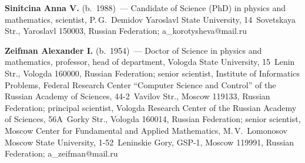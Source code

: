  \vspace*{1.5pt}
 
 \noindent
 \textbf{Sinitcina Anna V.} (b.\ 1988)~--- 
 Candidate of Science (PhD) in physics and mathematics, scientist, P.\,G.~Demidov Yaroslavl State University, 14~Sovetskaya Str., Yaroslavl 150003, 
 Russian Federation; \mbox{a\_korotysheva@mail.ru}

 \vspace*{1.5pt}
 
 \noindent
 \textbf{Zeifman Alexander I.} (b.\ 1954)~--- 
 Doctor of Science in physics and mathematics, professor, head of department, Vologda State University, 15~Lenin Str., Vologda 160000, Russian Federation;
  senior scientist, Institute of Informatics Problems, Federal Research Center ``Computer Science and Control'' 
  of the Russian Academy of Sciences, 44-2~Vavilov Str., Moscow 119133, Russian Federation; 
  principal scientist, Vologda Research Center of the Russian Academy of Sciences, 56A~Gorky Str., Vologda 160014, Russian Federation; 
  senior scientist, Moscow Center for Fundamental and Applied Mathematics, M.\,V.~Lomonosov Moscow State University, 1-52~Leninskie Gory, GSP-1, 
  Moscow 119991, Russian Federation; \mbox{a\_zeifman@mail.ru}
\label{end\stat}

\renewcommand{\bibname}{\protect\rm Литература}    